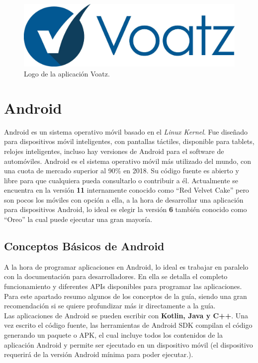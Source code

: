 \begin{figure}[h!]
  \centering
  \includegraphics[width=0.6\linewidth]{figs/EstadoArte/Apps/voatz}
  \caption[Nodos vista genérica]{Logo de la aplicación Voatz.}
  \label{fig:Voatz}
\end{figure}

\section{Android}

Android\cite{android} es un sistema operativo móvil basado en el \emph{Linux Kernel}. Fue diseñado para dispositivos móvil inteligentes, con pantallas táctiles, disponible para tablets, relojes inteligentes, incluso hay versiones de Android para el software de automóviles\cite{androidAuto}. Android es el sistema operativo móvil más utilizado del mundo, con una cuota de mercado superior al 90\% en 2018. Su código fuente es abierto y libre para que cualquiera pueda consultarlo o contribuir a él. Actualmente se encuentra en la versión \textbf{11} internamente conocido como ``Red Velvet Cake'' pero son pocos los móviles con opción a ella, a la hora de desarrollar una aplicación para dispositivos Android, lo ideal es elegir la versión \textbf{6} también conocido como ``Oreo'' la cual puede ejecutar una gran mayoría. 

\subsection{Conceptos Básicos de Android}

A la hora de programar aplicaciones en Android, lo ideal es trabajar en paralelo con la documentación para desarrolladores\cite{androidDocs}. En ella se detalla el completo funcionamiento y diferentes APIs disponibles para programar las aplicaciones. Para este apartado resumo algunos de los conceptos de la guía, siendo una gran recomendación si se quiere profundizar más ir directamente a la guía. \\

Las aplicaciones de Android se pueden escribir con \textbf{Kotlin, Java y C++}\cite{kotlin,java,c++}. Una vez escrito el código fuente, las herramientas de Android SDK compilan el código generando un paquete o APK, el cual incluye todos los contenidos de la aplicación Android y permite ser ejecutado en un dispositivo móvil (el dispositivo requerirá de la versión Android mínima para poder ejecutar.). \\

